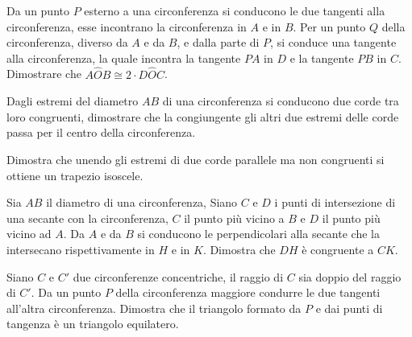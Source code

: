 \begin{multicols}{2}
\begin{esercizio}
\label{ese:5.27}
Da un punto $P$ esterno a una circonferenza si conducono le due tangenti alla circonferenza, esse incontrano la circonferenza in $A$ e in $B$. Per un punto $Q$ della circonferenza, diverso da $A$ e da $B$, e dalla parte di $P$, si conduce una tangente alla circonferenza, la quale incontra la tangente $PA$ in $D$ e la tangente $PB$ in $C$. Dimostrare che $A\widehat{O}B\cong 2\cdot D\widehat{O}C$. 
\end{esercizio}


\begin{esercizio}
\label{ese:5.29}
Dagli estremi del diametro $AB$ di una circonferenza si conducono due corde tra loro congruenti, dimostrare che la congiungente gli altri due estremi delle corde passa per il centro della circonferenza.
\end{esercizio}

\begin{esercizio}
\label{ese:5.30}
Dimostra che unendo gli estremi di due corde parallele ma non congruenti si ottiene un trapezio isoscele.
\end{esercizio}

\begin{esercizio}
\label{ese:5.31}
Sia $AB$ il diametro di una circonferenza, Siano $C$ e $D$ i punti di intersezione di una secante con la circonferenza, $C$ il punto più vicino a $B$ e $D$ il punto più vicino ad $A$. Da $A$ e da $B$ si conducono le perpendicolari alla secante che la intersecano rispettivamente in $H$ e in $K$. Dimostra che $DH$ è congruente a $CK$.
\end{esercizio}

\begin{esercizio}
\label{ese:5.32}
Siano $C$ e $C'$ due circonferenze concentriche, il raggio di $C$ sia doppio del raggio di $C'$. Da un punto $P$ della circonferenza maggiore condurre le due tangenti all'altra circonferenza. Dimostra che il triangolo formato da $P$ e dai punti di tangenza è un triangolo equilatero.
\end{esercizio}


\end{multicols}
